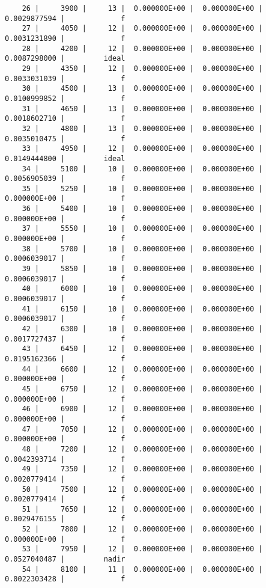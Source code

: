 \documentclass[
  authoryear,
  preprint,
  3p]{elsarticle}
\begin{document}
\begin{verbatim}
    26 |     3900 |     13 |  0.000000E+00 |  0.000000E+00 |  0.0029877594 |             f
    27 |     4050 |     12 |  0.000000E+00 |  0.000000E+00 |  0.0031231890 |             f
    28 |     4200 |     12 |  0.000000E+00 |  0.000000E+00 |  0.0087298000 |         ideal
    29 |     4350 |     12 |  0.000000E+00 |  0.000000E+00 |  0.0033031039 |             f
    30 |     4500 |     13 |  0.000000E+00 |  0.000000E+00 |  0.0100999852 |             f
    31 |     4650 |     13 |  0.000000E+00 |  0.000000E+00 |  0.0018602710 |             f
    32 |     4800 |     13 |  0.000000E+00 |  0.000000E+00 |  0.0035010475 |             f
    33 |     4950 |     12 |  0.000000E+00 |  0.000000E+00 |  0.0149444800 |         ideal
    34 |     5100 |     10 |  0.000000E+00 |  0.000000E+00 |  0.0056905039 |             f
    35 |     5250 |     10 |  0.000000E+00 |  0.000000E+00 |  0.000000E+00 |             f
    36 |     5400 |     10 |  0.000000E+00 |  0.000000E+00 |  0.000000E+00 |             f
    37 |     5550 |     10 |  0.000000E+00 |  0.000000E+00 |  0.000000E+00 |             f
    38 |     5700 |     10 |  0.000000E+00 |  0.000000E+00 |  0.0006039017 |             f
    39 |     5850 |     10 |  0.000000E+00 |  0.000000E+00 |  0.0006039017 |             f
    40 |     6000 |     10 |  0.000000E+00 |  0.000000E+00 |  0.0006039017 |             f
    41 |     6150 |     10 |  0.000000E+00 |  0.000000E+00 |  0.0006039017 |             f
    42 |     6300 |     10 |  0.000000E+00 |  0.000000E+00 |  0.0017727437 |             f
    43 |     6450 |     12 |  0.000000E+00 |  0.000000E+00 |  0.0195162366 |             f
    44 |     6600 |     12 |  0.000000E+00 |  0.000000E+00 |  0.000000E+00 |             f
    45 |     6750 |     12 |  0.000000E+00 |  0.000000E+00 |  0.000000E+00 |             f
    46 |     6900 |     12 |  0.000000E+00 |  0.000000E+00 |  0.000000E+00 |             f
    47 |     7050 |     12 |  0.000000E+00 |  0.000000E+00 |  0.000000E+00 |             f
    48 |     7200 |     12 |  0.000000E+00 |  0.000000E+00 |  0.0042393714 |             f
    49 |     7350 |     12 |  0.000000E+00 |  0.000000E+00 |  0.0020779414 |             f
    50 |     7500 |     12 |  0.000000E+00 |  0.000000E+00 |  0.0020779414 |             f
    51 |     7650 |     12 |  0.000000E+00 |  0.000000E+00 |  0.0029476155 |             f
    52 |     7800 |     12 |  0.000000E+00 |  0.000000E+00 |  0.000000E+00 |             f
    53 |     7950 |     12 |  0.000000E+00 |  0.000000E+00 |  0.0527040487 |         nadir
    54 |     8100 |     11 |  0.000000E+00 |  0.000000E+00 |  0.0022303428 |             f

\end{verbatim}
\end{document}

